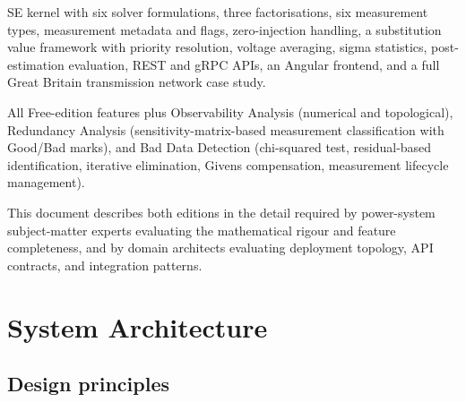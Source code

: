 \documentclass[11pt,a4paper]{article}
\begin{document}
\begin{description}[style=nextline]
  \item[Free Edition (Apache 2.0)]
    SE kernel with six solver formulations, three factorisations,
    six measurement types, measurement metadata and flags, zero-injection
    handling, a substitution value framework with priority resolution,
    voltage averaging, sigma statistics, post-estimation evaluation,
    REST and gRPC APIs, an Angular frontend, and a full Great Britain
    transmission network case study.
  \item[Pro Edition (Commercial)]
    All Free-edition features plus Observability Analysis (numerical
    and topological), Redundancy Analysis (sensitivity-matrix-based
    measurement classification with Good/Bad marks), and Bad Data
    Detection (chi-squared test, residual-based identification, iterative
    elimination, Givens compensation, measurement lifecycle management).
\end{description}

This document describes both editions in the detail required by
power-system subject-matter experts evaluating the mathematical rigour and
feature completeness, and by domain architects evaluating deployment
topology, API contracts, and integration patterns.



\section{System Architecture}\label{sec:arch}

\subsection{Design principles}
\end{document}
